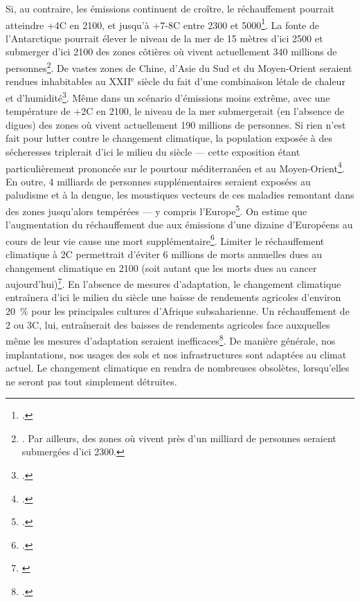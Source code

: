 \documentclass[a5paper,french,openany]{memoir}
\begin{document}
Si, au contraire, les émissions continuent de croître, le réchauffement pourrait atteindre +4\textdegree{}C en 2100, et jusqu'à +7-8\textdegree{}C entre 2300 et 5000\footnote{\citet{montenegro_long_2007}.}. La fonte de l'Antarctique pourrait élever le niveau de la mer de 15 mètres d'ici 2500 et submerger d'ici 2100 des zones côtières où vivent actuellement 340 millions de personnes\footnote{\cite{kulp_new_2019,deconto_contribution_2016,kopp_evolving_2017}. Par ailleurs, des zones où vivent près d'un milliard de personnes seraient submergées d'ici 2300.}. De vastes zones de Chine, d'Asie du Sud et du Moyen-Orient seraient rendues inhabitables au XXII$^\text{e}$ siècle du fait d'une combinaison létale de chaleur et d'humidité\footnote{\citet{pal_future_2016,im_deadly_2017,kang_north_2018}.}. Même dans un scénario d'émissions moins extrême, avec une température de +2\textdegree{}C en 2100, le niveau de la mer submergerait (en l'absence de digues) des zones où vivent actuellement 190 millions de personnes. %
Si rien n'est fait pour lutter contre le changement climatique, la population exposée à des sécheresses triplerait d'ici le milieu du siècle --- cette exposition étant particulièrement prononcée sur le pourtour méditerranéen et au Moyen-Orient\footnote{\cite{elliott_constraints_2014,marzi_assessing_2021}.}. En outre, 4 milliards de personnes supplémentaires seraient exposées au paludisme et à la dengue, les moustiques vecteurs de ces maladies remontant dans des zones jusqu'alors tempérées --- y compris l'Europe\footnote{\cite{colon-gonzalez_projecting_2021}.}. On estime que l'augmentation du réchauffement due aux émissions d'une dizaine d'Européens au cours de leur vie cause une mort supplémentaire\footnote{\cite{bressler_mortality_2021}.}. Limiter le réchauffement climatique à 2\textdegree{}C permettrait d'éviter 6 millions de morts annuelles dues au changement climatique en 2100 (soit autant que les morts dues au cancer aujourd'hui)\footnote{\cite{carleton_valuing_2022}}. En l'absence de mesures d'adaptation, le changement climatique entraînera d'ici le milieu du siècle une baisse de rendements agricoles d'environ 20~\% pour les principales cultures d'Afrique subsaharienne. Un réchauffement de 2 ou 3\textdegree{}C, lui, entraînerait des baisses de rendements agricoles face auxquelles même les mesures d'adaptation seraient inefficaces\footnote{\cite{schlenker_robust_2010,moore_new_2017}.}. De manière générale, nos implantations, nos usages des sols et nos infrastructures sont adaptées au climat actuel. Le changement climatique en rendra de nombreuses obsolètes, lorsqu'elles ne seront pas tout simplement détruites. 
\end{document}
